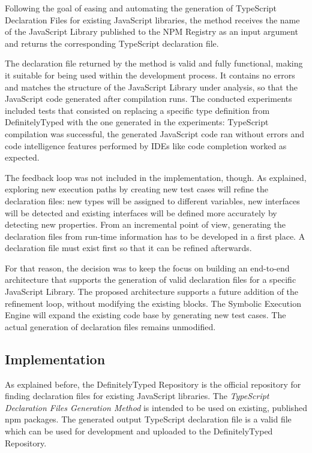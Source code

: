 Following the goal of easing and automating the generation of TypeScript Declaration Files for existing JavaScript libraries, the method receives the name of the JavaScript Library published to the NPM Registry as an input argument and returns the corresponding TypeScript declaration file.

The declaration file returned by the method is valid and fully functional, making it suitable for being used within the development process. It contains no errors and matches the structure of the JavaScript Library under analysis, so that the JavaScript code generated after compilation runs. The conducted experiments included tests that consisted on replacing a specific type definition from DefinitelyTyped \citep{definitely-typed-repository} with the one generated in the experiments: TypeScript compilation was successful, the generated JavaScript code ran without errors and code intelligence features performed by IDEs like code completion worked as expected.

The feedback loop was not included in the implementation, though. As explained, exploring new execution paths by creating new test cases will refine the declaration files: new types will be assigned to different variables, new interfaces will be detected and existing interfaces will be defined more accurately by detecting new properties. From an incremental point of view, generating the declaration files from run-time information has to be developed in a first place. A declaration file must exist first so that it can be refined afterwards.

For that reason, the decision was to keep the focus on building an end-to-end architecture that supports the generation of valid declaration files for a specific JavaScript Library. The proposed architecture supports a future addition of the refinement loop, without modifying the existing blocks. The Symbolic Execution Engine will expand the existing code base by generating new test cases. The actual generation of declaration files remains unmodified. 

\subsection{Implementation}
As explained before, the DefinitelyTyped Repository is the official repository for finding declaration files for existing JavaScript libraries. The \textit{TypeScript Declaration Files Generation Method} is intended to be used on existing, published npm packages. The generated output TypeScript declaration file is a valid file which can be used for development and uploaded to the DefinitelyTyped Repository.

